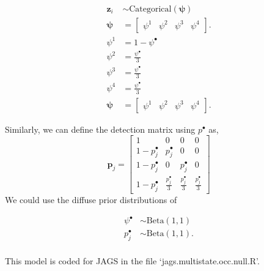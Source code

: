 \documentclass[12pt]{article}
\begin{document}
\begin{center}
\begin{align*}
\textbf{z}_{i} &\sim \text{Categorical}(\boldsymbol{\psi})\\
\boldsymbol{\psi} &= \begin{bmatrix} \psi^1 & \psi^2 & \psi^3 & \psi^4 \end{bmatrix}.\\
\psi^1 &= 1-\psi^{\bullet}\\
\psi^2 &=\frac{\psi^{\bullet}}{3}\\
\psi^3 &=\frac{\psi^{\bullet}}{3}\\
\psi^4 &=\frac{\psi^{\bullet}}{3}\\
\boldsymbol{\psi} &= \begin{bmatrix} \psi^1 & \psi^2 & \psi^3 & \psi^4 \end{bmatrix}.
\end{align*}
\end{center}

Similarly, we can define the detection matrix using $p^{\bullet}$ as,
\begin{equation}
\boldsymbol{p}_{j} = \begin{bmatrix} 1 & 0 & 0 & 0 \\ 
									1-p^{\bullet}_{j} & p^{\bullet}_{j} & 0 & 0 \\ 
									1-p^{\bullet}_{j} & 0 & p^{\bullet}_{j} & 0\\
  								      1-p^{\bullet}_{j} & \frac{p^{\bullet}_{j}}{3} & \frac{p^{\bullet}_{j}}{3} & \frac{p^{\bullet}_{j}}{3}
  								      \end{bmatrix}
\end{equation}
We could use the diffuse prior distributions of 
\begin{center}
\begin{align*}
\psi^{\bullet} &\sim \text{Beta}(1,1)\\
p^{\bullet}_{j} &\sim \text{Beta}(1,1).\\
\end{align*}
\end{center}

This model is coded for JAGS in the file `jags.multistate.occ.null.R'.
\end{document}
